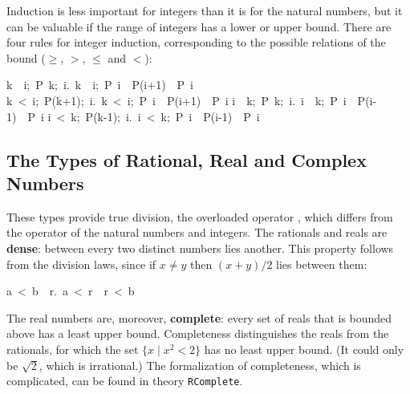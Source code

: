 Induction is less important for integers than it is for the natural numbers, but it can be valuable if the range of integers has a lower or upper bound.  There are four rules for integer induction, corresponding to the possible relations of the bound ($\geq$, $>$, $\leq$ and $<$):
\begin{isabelle}
\isasymlbrakk k\ \isasymle \ i;\ P\ k;\ \isasymAnd i.\ \isasymlbrakk k\ \isasymle \ i;\ P\ i\isasymrbrakk \ \isasymLongrightarrow \ P(i+1)\isasymrbrakk \ \isasymLongrightarrow \ P\ i%
\isanewline
\isasymlbrakk k\ <\ i;\ P(k+1);\ \isasymAnd i.\ \isasymlbrakk k\ <\ i;\ P\ i\isasymrbrakk \ \isasymLongrightarrow \ P(i+1)\isasymrbrakk \ \isasymLongrightarrow \ P\ i%
\isanewline
\isasymlbrakk i\ \isasymle \ k;\ P\ k;\ \isasymAnd i.\ \isasymlbrakk i\ \isasymle \ k;\ P\ i\isasymrbrakk \ \isasymLongrightarrow \ P(i-1)\isasymrbrakk \ \isasymLongrightarrow \ P\ i%
\isanewline
\isasymlbrakk i\ <\ k;\ P(k-1);\ \isasymAnd i.\ \isasymlbrakk i\ <\ k;\ P\ i\isasymrbrakk \ \isasymLongrightarrow \ P(i-1)\isasymrbrakk \ \isasymLongrightarrow \ P\ i%
\end{isabelle}


\subsection{The Types of Rational, Real and Complex Numbers}
\label{sec:real}

%
%
%
These types provide true division, the overloaded operator \isa{/},
which differs from the operator  of the
natural numbers and integers. The rationals and reals are
\textbf{dense}: between every two distinct numbers lies another.
This property follows from the division laws, since if $x\not=y$ then $(x+y)/2$ lies between them:
\begin{isabelle}
a\ <\ b\ \isasymLongrightarrow \ \isasymexists r.\ a\ <\ r\ \isasymand \ r\ <\ b%
\end{isabelle}

The real numbers are, moreover, \textbf{complete}: every set of reals that
is bounded above has a least upper bound.  Completeness distinguishes the
reals from the rationals, for which the set $\{x\mid x^2<2\}$ has no least
upper bound.  (It could only be $\surd2$, which is irrational.) The
formalization of completeness, which is complicated,
can be found in theory \texttt{RComplete}.

